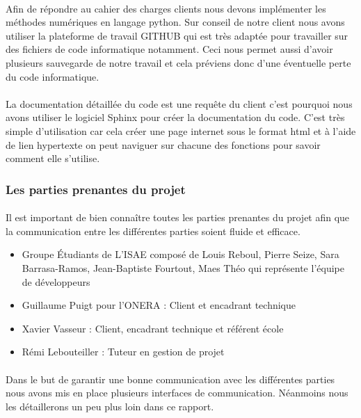     \paragraph{}
     Afin de répondre au cahier des charges clients nous devons implémenter les méthodes numériques en langage python. Sur conseil de notre client nous avons utiliser la plateforme de travail GITHUB qui est très adaptée pour travailler sur des fichiers de code informatique notamment. Ceci nous permet aussi d'avoir plusieurs sauvegarde de notre travail et cela préviens donc d'une éventuelle perte du code informatique.
    \paragraph{}
    La documentation détaillée du code est une requête du client c'est pourquoi nous avons utiliser le logiciel Sphinx pour créer la documentation du code. C'est très simple d'utilisation car cela créer une page internet sous le format html et à l'aide de lien hypertexte on peut naviguer sur chacune des fonctions pour savoir comment elle s'utilise.   
	
    \subsubsection{Les parties prenantes du projet}	
    \paragraph{}
     Il est important de bien connaître toutes les parties prenantes du projet afin que la communication entre les différentes parties soient fluide et efficace. 
    \begin{itemize}
        \item Groupe Étudiants de L'ISAE composé de Louis Reboul, Pierre Seize, Sara Barrasa-Ramos, Jean-Baptiste Fourtout, Maes Théo qui représente l'équipe de développeurs
   	    \item Guillaume  Puigt pour l'ONERA : Client et encadrant technique
   	    \item Xavier Vasseur : Client, encadrant technique et référent école
   	    \item Rémi Lebouteiller : Tuteur en gestion de projet
    \end{itemize}
    
    \paragraph{}
    Dans le but de garantir une bonne communication avec les différentes parties nous avons mis en place plusieurs interfaces de communication. Néanmoins nous les détaillerons un peu plus loin dans ce rapport. 


